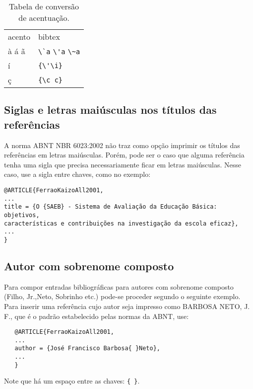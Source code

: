 \documentclass[a4paper]{ltxdoc}
\begin{document}
\begin{table}[htbp]
\caption{Tabela de conversão de acentuação.}
\label{tabela-acentos}

\begin{center}
\begin{tabular}{ll}\hline\hline
acento & \textsf{bibtex}\\
à á ã & \verb+\`a+ \verb+\'a+ \verb+\~a+\\
í & \verb+{\'\i}+\\
ç & \verb+{\c c}+\\
\hline\hline
\end{tabular}
\end{center}
\end{table}

\subsection{Siglas e letras maiúsculas nos títulos das referências}

A norma ABNT NBR 6023:2002 não traz como opção imprimir os títulos das
referências em letras maiúsculas. Porém, pode ser o caso que alguma referência
tenha uma sigla que precisa necessariamente ficar em letras maiúsculas. Nesse
caso, use a sigla entre chaves, como no exemplo:

\begin{verbatim}
@ARTICLE{FerraoKaizoAll2001,
...
title = {O {SAEB} - Sistema de Avaliação da Educação Básica: objetivos,
características e contribuições na investigação da escola eficaz},
...
}
\end{verbatim}

\subsection{Autor com sobrenome composto}

Para compor entradas bibliográficas para autores com sobrenome composto (Filho, Jr.,Neto, Sobrinho etc.) pode-se proceder segundo o seguinte exemplo.
Para inserir uma referência cujo autor seja impresso como BARBOSA NETO, J. F., que é o padrão estabelecido pelas normas da ABNT, use:

\begin{verbatim}
   @ARTICLE{FerraoKaizoAll2001,
   ...
   author = {José Francisco Barbosa{ }Neto},
   ...
   }
\end{verbatim}

Note que há um espaço entre as chaves: \verb+{ }+.
   
\end{document}
